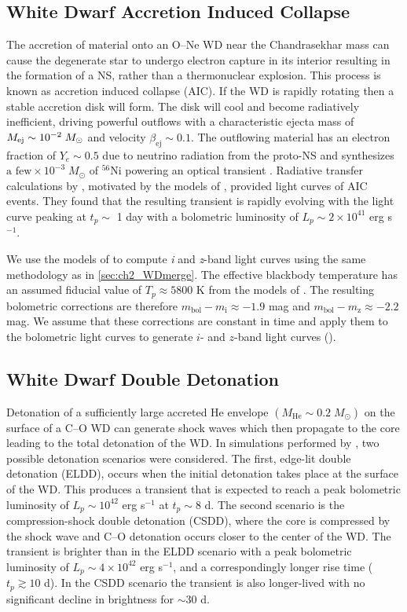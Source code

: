\subsection{White Dwarf Accretion Induced Collapse}
\label{sec:ch2_AIC}
The accretion of material onto an O--Ne WD near the Chandrasekhar mass can cause the degenerate star to undergo electron capture in its interior resulting in the formation of a NS, rather than a thermonuclear explosion. This process is known as accretion induced collapse (AIC). If the WD is rapidly rotating then a stable accretion disk will form. The disk will cool and become radiatively inefficient, driving powerful outflows with a characteristic ejecta mass of $M_{\rm ej} \sim 10^{-2}\;M_{\odot}$ and velocity $\beta_{\text{ej}} \sim 0.1$. The outflowing material has an electron fraction of $Y_e \sim 0.5$ due to neutrino radiation from the proto-NS and synthesizes $\text{a few} \times 10^{-3}\; M_{\odot}$ of ${}^{56}$Ni powering an optical transient \citep{Metzger+09b}. Radiative transfer calculations by \citet{Darbha+10}, motivated by the models of \citet{Metzger+09b}, provided light curves of AIC events. They found that the resulting transient is rapidly evolving with the light curve peaking at $t_p \sim$ 1 day with a bolometric luminosity of $L_p \sim 2\times10^{41}$ erg s$^{-1}$.

We use the models of \citet{Darbha+10} to compute \emph{i} and \emph{z}-band light curves using the same methodology as in \cref{sec:ch2_WDmerge}. The effective blackbody temperature has an assumed fiducial value of $T_p \approx 5800$ K from the models of \citet[see their Figure 3]{Darbha+10}. The resulting bolometric corrections are therefore $m_{\text{bol}} - m_{\text{i}} \approx -1.9$ mag and $m_{\text{bol}} - m_{\text{z}} \approx -2.2$ mag. We assume that these corrections are constant in time and apply them to the bolometric light curves to generate $i$- and $z$-band light curves ().

\subsection{White Dwarf Double Detonation}
\label{sec:ch2_ELDD}
Detonation of a sufficiently large accreted He envelope $(M_{\text{He}} \sim 0.2\; M_{\odot})$ on the surface of a C--O WD can generate shock waves which then propagate to the core leading to the total detonation of the WD. In simulations performed by \citet{Sim+12}, two possible detonation scenarios were considered. The first, edge-lit double detonation (ELDD), occurs when the initial detonation takes place at the surface of the WD. This produces a transient that is expected to reach a peak bolometric luminosity of $L_p \sim 10^{42}$ erg s$^{-1}$ at $t_p \sim 8$ d. The second scenario is the compression-shock double detonation (CSDD), where the core is compressed by the shock wave and C--O detonation occurs closer to the center of the WD. The transient is brighter than in the ELDD scenario with a peak bolometric luminosity of $L _p \sim 4\times10^{42}$ erg s$^{-1}$, and a correspondingly longer rise time ($t_p  \gtrsim 10$ d). In the CSDD scenario the transient is also longer-lived with no significant decline in brightness for $\sim 30$ d.

